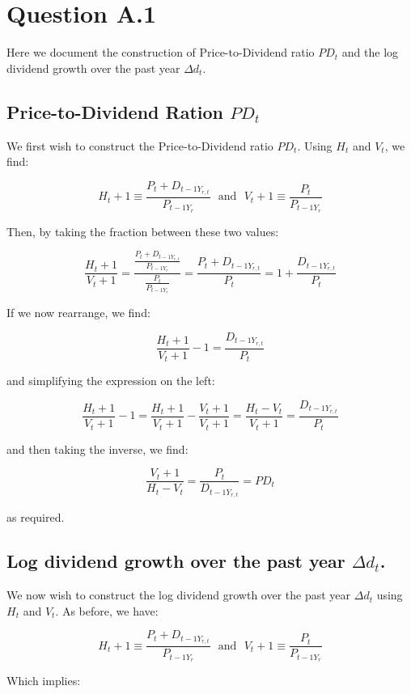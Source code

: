 \documentclass[11pt]{article}
\begin{document}
\section*{Question A.1}

Here we document the construction of Price-to-Dividend ratio $PD_t$ and the log dividend growth over the past year $\Delta d_t$.

\subsection*{Price-to-Dividend Ration $PD_t$}

We first wish to construct the Price-to-Dividend ratio $PD_t$. Using $H_t$ and $V_t$, we find:

\[H_t + 1 \equiv \frac{P_t + D_{t-1 Y_{r,t}}}{P_{t-1Y_r}} \ \ \ \text{and} \ \ \ V_t + 1 \equiv \frac{P_t}{P_{t-1 Y_r}} \]

\noindent Then, by taking the fraction between these two values:

\[\frac{H_t+1}{V_t+1} = \frac{\frac{P_t + D_{t-1 Y_{r,t}}}{P_{t-1Y_r}}}{\frac{P_t}{P_{t-1 Y_r}}} = \frac{P_t + D_{t-1 Y_{r,t}}}{P_t} = 1 + \frac{D_{t-1 Y_{r,t}}}{P_t}\]

\noindent If we now rearrange, we find:

\[\frac{H_t+1}{V_t+1} - 1 = \frac{D_{t-1 Y_{r,t}}}{P_t}\] 

\noindent and simplifying the expression on the left:

\[\frac{H_t+1}{V_t+1} - 1 = \frac{H_t+1}{V_t+1} - \frac{V_t+1}{V_t+1} = \frac{H_t - V_t}{V_t + 1} = \frac{D_{t-1 Y_{r,t}}}{P_t}\]

\noindent and then taking the inverse, we find:

\[\frac{V_t + 1}{H_t - V_t} = \frac{P_t}{D_{t-1 Y_{r,t}}} = PD_t \]

\noindent as required.

\subsection*{Log dividend growth over the past year $\Delta d_t$.}

\noindent We now wish to construct  the log dividend growth over the past year $\Delta d_t$ using $H_t$ and $V_t$. As before, we have:

\[H_t + 1 \equiv \frac{P_t + D_{t-1 Y_{r,t}}}{P_{t-1Y_r}} \ \ \ \text{and} \ \ \ V_t + 1 \equiv \frac{P_t}{P_{t-1 Y_r}} \]

\noindent Which implies:
\end{document}
